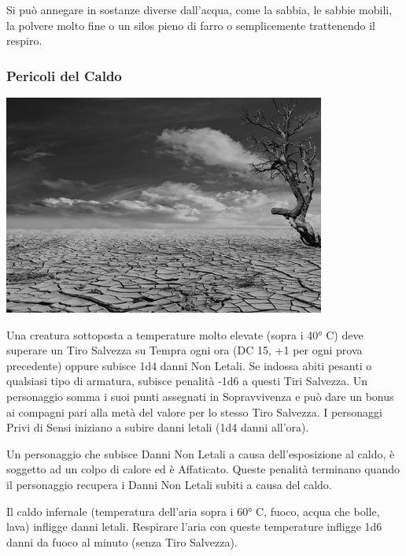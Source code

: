 \begin{multicols}{2}
Si può annegare in sostanze diverse dall'acqua, come la sabbia, le sabbie mobili, la polvere molto fine o un silos pieno di farro o semplicemente trattenendo il respiro.

\subsubsection{Pericoli del Caldo}

\begin{center}
	\includegraphics[height=0.65\linewidth]{immagini/desert.png}
\end{center}

\label{pericoli-del-caldo}

Una creatura sottoposta a temperature molto elevate (sopra i 40° C) deve superare un Tiro Salvezza su Tempra ogni ora (DC 15, +1 per ogni prova precedente) oppure subisce 1d4 danni Non Letali. Se indossa abiti pesanti o qualsiasi tipo di armatura, subisce penalità -1d6 a questi Tiri Salvezza. Un personaggio somma i suoi punti assegnati in Sopravvivenza e può dare un bonus ai compagni pari alla metà del valore per lo stesso Tiro Salvezza. I personaggi Privi di Sensi iniziano a subire danni letali (1d4 danni all'ora).

Un personaggio che subisce Danni Non Letali a causa dell'esposizione al caldo, è soggetto ad un colpo di calore ed è Affaticato. Queste penalità terminano quando il personaggio recupera i Danni Non Letali subiti a causa del caldo.

Il caldo infernale (temperatura dell'aria sopra i 60° C, fuoco, acqua che bolle, lava) infligge danni letali. Respirare l'aria con queste temperature infligge 1d6 danni da fuoco al minuto (senza Tiro Salvezza).


\end{multicols}
